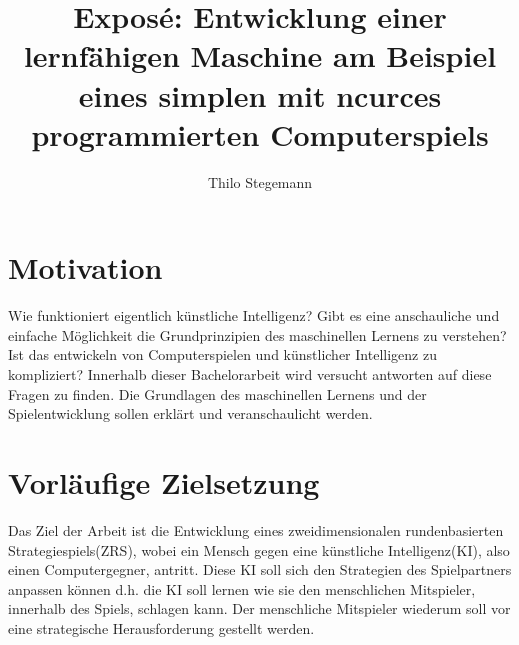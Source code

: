 \documentclass[12pt,a4paper]{article}
\author{Thilo Stegemann}
\title{Exposé: Entwicklung einer lernfähigen Maschine am Beispiel eines simplen mit ncurces programmierten Computerspiels}
\begin{document}
\maketitle

\section*{Motivation}
Wie funktioniert eigentlich künstliche Intelligenz? Gibt es eine anschauliche und einfache Möglichkeit die Grundprinzipien des maschinellen Lernens zu verstehen? Ist das entwickeln von Computerspielen und künstlicher Intelligenz zu kompliziert?
Innerhalb dieser Bachelorarbeit wird versucht antworten auf diese Fragen zu finden. Die Grundlagen des maschinellen Lernens und der Spielentwicklung sollen erklärt und veranschaulicht werden. 

\section*{Vorläufige Zielsetzung}
Das Ziel der Arbeit ist die Entwicklung eines zweidimensionalen rundenbasierten Strategiespiels(ZRS), wobei ein Mensch gegen eine künstliche Intelligenz(KI), also einen Computergegner, antritt. Diese KI soll sich den Strategien des Spielpartners anpassen können d.h. die KI soll lernen wie sie den menschlichen Mitspieler, innerhalb des Spiels, schlagen kann. Der menschliche Mitspieler wiederum soll vor eine strategische Herausforderung gestellt werden.
\end{document}
